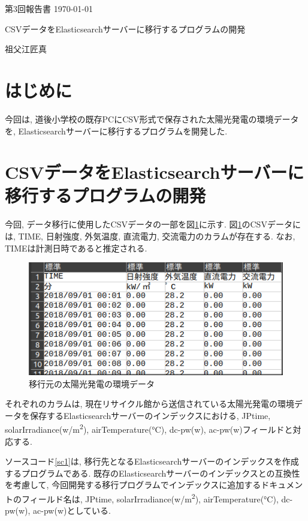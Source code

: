 \documentclass[a4j,12pt,]{jarticle}
\begin{document}
{\noindent\small 第3回報告書 \hfill\today}
\begin{center}
  {\Large CSVデータをElasticsearchサーバーに移行するプログラムの開発}
\end{center}
\begin{flushright}
  祖父江匠真 \\
\end{flushright}

\section{はじめに}
今回は, 道後小学校の既存PCにCSV形式で保存された太陽光発電の環境データ \cite{1}を, Elasticsearchサーバーに移行するプログラムを開発した.

\section{CSVデータをElasticsearchサーバーに移行するプログラムの開発}
今回, データ移行に使用したCSVデータの一部を図\ref{p1}に示す.
図\ref{p1}のCSVデータには, TIME, 日射強度, 外気温度, 直流電力, 交流電力のカラムが存在する.
なお, TIMEは計測日時であると推定される.

\begin{figure}[H]
  \begin{center}
    \includegraphics[width=160mm]{csv.png}
    \caption{移行元の太陽光発電の環境データ}
    \label{p1}
  \end{center}
\end{figure}

それぞれのカラムは, 現在リサイクル館から送信されている太陽光発電の環境データを保存するElasticsearchサーバーのインデックスにおける, JPtime, solarIrradiance(\si{\kilo{}}w/\si{\metre\squared}), airTemperature(\si{\degreeCelsius}), dc-pw(\si{\kilo{}}w), ac-pw(\si{\kilo{}}w)フィールドと対応する.

ソースコード\ref{sc1}は, 移行先となるElasticsearchサーバーのインデックスを作成するプログラムである.
既存のElasticsearchサーバーのインデックスとの互換性を考慮して, 今回開発する移行プログラムでインデックスに追加するドキュメントのフィールド名は, JPtime, solarIrradiance(\si{\kilo{}}w/\si{\metre\squared}), airTemperature(\si{\degreeCelsius}), dc-pw(\si{\kilo{}}w), ac-pw(\si{\kilo{}}w)としている.
\end{document}
